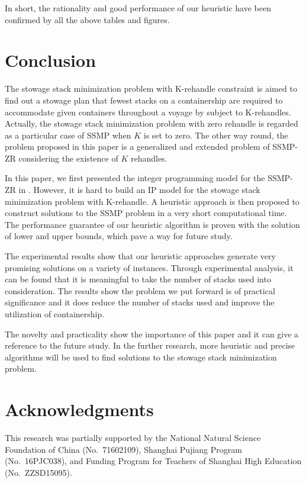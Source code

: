 \documentclass[review,3p,times,authoryear,12pt]{elsarticle}
\begin{document}
In short, the rationality and good performance of our heuristic have been confirmed by all the above tables and figures.

\section{Conclusion}
\label{sec:con}
The stowage stack minimization problem with K-rehandle constraint is aimed to find out a stowage plan that fewest stacks on a containership are required to accommodate given containers throughout a voyage by subject to K-rehandles.
Actually, the stowage stack minimization problem with zero rehandle is regarded as a particular case of SSMP when $K$ is set to zero.
The other way round, the problem proposed in this paper is a generalized and extended problem of SSMP-ZR considering the existence of $K$ rehandles.

In this paper, we first presented the integer programming model for the SSMP-ZR in \cite{wang2014stowage}.
However, it is hard to build an IP model for the stowage stack minimization problem with K-rehandle.
A heuristic approach is then proposed to construct solutions to the SSMP problem in a very short computational time.
The performance guarantee of our heuristic algorithm is proven with the solution of lower and upper bounds, which pave a way for future study.

The experimental results show that our heuristic approaches generate very promising solutions on a variety of instances.
Through experimental analysis, it can be found that it is meaningful to take the number of stacks used into consideration.
The results show the problem we put forward is of practical significance and it does reduce the number of stacks used and improve the utilization of containership.

The novelty and practicality show the importance of this paper and it can give a reference to the future study.
In the further research, more heuristic and precise algorithms will be used to find solutions to the stowage stack minimization problem.

\section*{Acknowledgments}

This research was partially supported by the National Natural Science Foundation of China (No.\ 71602109), Shanghai Pujiang Program (No.\ 16PJC038), and Funding Program for Teachers of Shanghai High Education (No.\ ZZSD15095).



\end{document}
